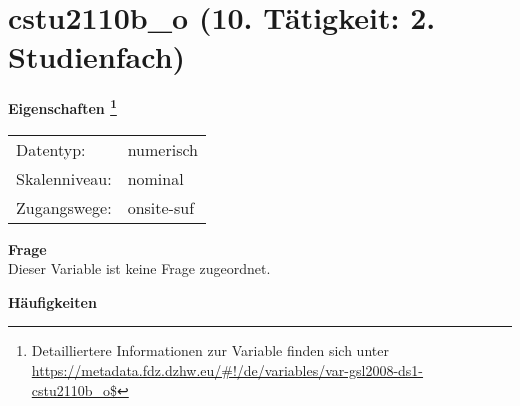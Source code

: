 
    \setcounter{footnote}{0}

    \vspace*{-1.8cm}
	\section{cstu2110b\_o (10. Tätigkeit: 2. Studienfach)}
	\label{section:cstu2110b_o}



    \vspace*{0.5cm}
    \noindent\textbf{Eigenschaften
	\footnote{Detailliertere Informationen zur Variable finden sich unter
		\url{https://metadata.fdz.dzhw.eu/\#!/de/variables/var-gsl2008-ds1-cstu2110b_o$}}}\\
	\begin{tabularx}{\hsize}{@{}lX}
	Datentyp: & numerisch \\
	Skalenniveau: & nominal \\
	Zugangswege: &
	  onsite-suf
 \\
    \end{tabularx}



		\vspace*{0.5cm}
		\noindent\textbf{Frage}\\
		Dieser Variable ist keine Frage zugeordnet.





        		\vspace*{0.5cm}
                \noindent\textbf{Häufigkeiten}

